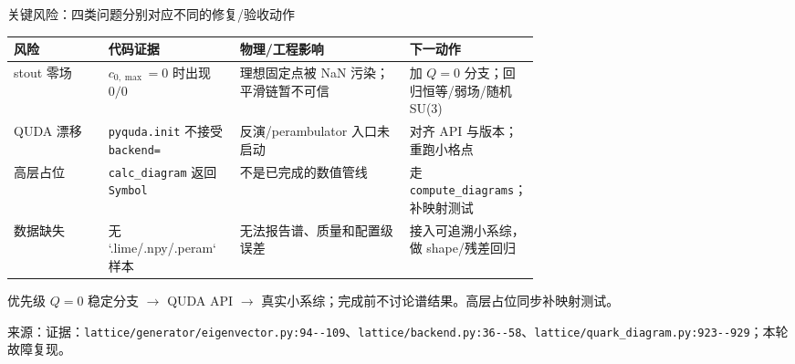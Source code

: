 \documentclass[UTF8,aspectratio=169,11pt]{ctexbeamer}
\newcommand{\source}[1]{%
  \vspace{0.06em}\par{\raggedright\scriptsize\color{muted}来源：#1\par}}
\newcommand{\codepath}[1]{\nolinkurl{#1}}
\begin{document}
\begin{frame}[t]{关键风险：四类问题分别对应不同的修复/验收动作}
  \centering
  \small
  \begin{tabularx}{0.98\linewidth}{@{}L{0.18\linewidth}L{0.25\linewidth}Y L{0.24\linewidth}@{}}
    \toprule
    风险 & 代码证据 & 物理/工程影响 & 下一动作 \\
    \midrule
    stout 零场 & $c_{0,\max}=0$ 时出现 $0/0$ & 理想固定点被 NaN 污染；平滑链暂不可信 & 加 $Q=0$ 分支；回归恒等/弱场/随机 SU(3) \\
    QUDA 漂移 & \texttt{pyquda.init} 不接受 \texttt{backend=} & 反演/perambulator 入口未启动 & 对齐 API 与版本；重跑小格点 \\
    高层占位 & \texttt{calc\_diagram} 返回 \texttt{Symbol} & 不是已完成的数值管线 & 走 \texttt{compute\_diagrams}；补映射测试 \\
    数据缺失 & 无 `.lime/.npy/.peram` 样本 & 无法报告谱、质量和配置级误差 & 接入可追溯小系综，做 shape/残差回归 \\
    \bottomrule
  \end{tabularx}
  \vspace{0.12cm}
  \begin{alertblock}{优先级}
    \small
    $Q=0$ 稳定分支 \(\to\) QUDA API \(\to\) 真实小系综；完成前不讨论谱结果。高层占位同步补映射测试。
  \end{alertblock}
  \source{证据：\codepath{lattice/generator/eigenvector.py:94--109}、\codepath{lattice/backend.py:36--58}、\codepath{lattice/quark_diagram.py:923--929}；本轮故障复现。}
\end{frame}
\end{document}
